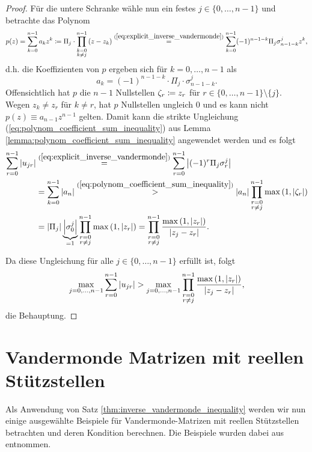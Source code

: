 \begin{proof}
    \noindent Für die untere Schranke wähle nun ein festes
    $j \in \{0, \dots, n-1\}$ und betrachte das Polynom
    \[
        p(z) = \sum_{k=0}^{n-1} a_k z^k
        \coloneqq \Pi_j \cdot \prod_{\substack{k=0\\ k \neq j}}^{n-1} \left( z - z_k \right)
        \overset{(\ref{eq:explicit_inverse_vandermonde})}{=} \sum_{k=0}^{n-1} (-1)^{n-1-k} \Pi_j \sigma_{n-1-k}^j z^k,
    \]
    d.h. die Koeffizienten von $p$ ergeben sich für $k = 0, \dots, n-1$ als
    \[
        a_k = (-1)^{n-1-k} \cdot \Pi_j \cdot \sigma_{n-1-k}^j.
    \]
    Offensichtlich hat $p$ die $n-1$ Nullstellen
    $\zeta_r \coloneqq z_r$ für $r \in \{0,\dots,n-1\} \setminus \{j\}$.
    Wegen $z_k \neq z_r$ für $k \neq r$, hat $p$ Nullstellen ungleich $0$ und
    es kann nicht $p(z) \equiv a_{n-1} z^{n-1}$ gelten.
    Damit kann die strikte Ungleichung
    (\ref{eq:polynom_coefficient_sum_inequality}) aus Lemma
    \ref{lemma:polynom_coefficient_sum_inequality} angewendet werden und es
    folgt
    \[
        \begin{split}
            \sum_{r=0}^{n-1} \left\lvert u_{jr} \right\rvert
            &\overset{(\ref{eq:explicit_inverse_vandermonde})}{=}
                \sum_{r=0}^{n-1} \left\lvert (-1)^r \Pi_j \sigma_r^j \right\rvert\\
            &= \sum_{k=0}^{n-1} \left\lvert a_n \right\rvert
            \overset{(\ref{eq:polynom_coefficient_sum_inequality})}{>}
                \left\lvert a_{n} \right\rvert \prod_{\substack{r=0\\ r \neq j}}^{n-1} \max \left(1, \left\lvert \zeta_r \right\rvert \right)\\
            &= \left\lvert \Pi_j \right\rvert \underbrace{\left\lvert \sigma_0^j \right\rvert}_{=1} \prod_{\substack{r=0\\ r \neq j}}^{n-1} \max \left(1, \left\lvert z_r \right\rvert \right)
            = \prod_{\substack{r=0\\ r \neq j}}^{n-1} \frac{\max \left(1, \left\lvert z_r \right\rvert \right)}{\left\lvert z_j - z_r \right\rvert}.
        \end{split}
    \]

    \noindent Da diese Ungleichung für alle $j \in \{0, \dots, n-1\}$ erfüllt ist, folgt
    \[
        \max_{j = 0, \dots, n-1} \sum_{r=0}^{n-1} \left\lvert u_{jr} \right\rvert
        > \max_{j = 0, \dots, n-1} \prod_{\substack{r=0\\ r \neq j}}^{n-1} \frac{\max \left(1, \left\lvert z_r \right\rvert \right)}{\left\lvert z_j - z_r \right\rvert},
    \]
    die Behauptung.
\end{proof}

\section{Vandermonde Matrizen mit reellen Stützstellen}
Als Anwendung von Satz \ref{thm:inverse_vandermonde_inequality} werden wir nun
einige ausgewählte Beispiele für Vandermonde-Matrizen mit reellen Stützstellen
betrachten und deren Kondition berechnen.
Die Beispiele wurden dabei aus \cite[S. 197-199]{gautschi1} entnommen.

